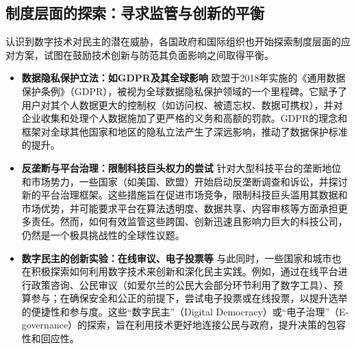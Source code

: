 \documentclass[UTF8, 10pt]{ctexbook}
\begin{document}
\subsection{制度层面的探索：寻求监管与创新的平衡}
认识到数字技术对民主的潜在威胁，各国政府和国际组织也开始探索制度层面的应对方案，试图在鼓励技术创新与防范其负面影响之间取得平衡。
\begin{itemize}
    \item \textbf{数据隐私保护立法：如GDPR及其全球影响}
    欧盟于2018年实施的《通用数据保护条例》（GDPR），被视为全球数据隐私保护领域的一个里程碑。它赋予了用户对其个人数据更大的控制权（如访问权、被遗忘权、数据可携权），并对企业收集和处理个人数据施加了更严格的义务和高额的罚款。GDPR的理念和框架对全球其他国家和地区的隐私立法产生了深远影响，推动了数据保护标准的提升。

    \item \textbf{反垄断与平台治理：限制科技巨头权力的尝试}
    针对大型科技平台的垄断地位和市场势力，一些国家（如美国、欧盟）开始启动反垄断调查和诉讼，并探讨新的平台治理框架。这些措施旨在促进市场竞争，限制科技巨头滥用其数据和市场优势，并可能要求平台在算法透明度、数据共享、内容审核等方面承担更多责任。然而，如何有效监管这些跨国、创新迅速且影响力巨大的科技公司，仍然是一个极具挑战性的全球性议题。

    \item \textbf{数字民主的创新实验：在线审议、电子投票等}
    与此同时，一些国家和城市也在积极探索如何利用数字技术来创新和深化民主实践。例如，通过在线平台进行政策咨询、公民审议（如爱尔兰的公民大会部分环节利用了数字工具）、预算参与；在确保安全和公正的前提下，尝试电子投票或在线投票，以提升选举的便捷性和参与度。这些“数字民主”（Digital Democracy）或“电子治理”（E-governance）的探索，旨在利用技术更好地连接公民与政府，提升决策的包容性和回应性。
\end{itemize}
\end{document}
